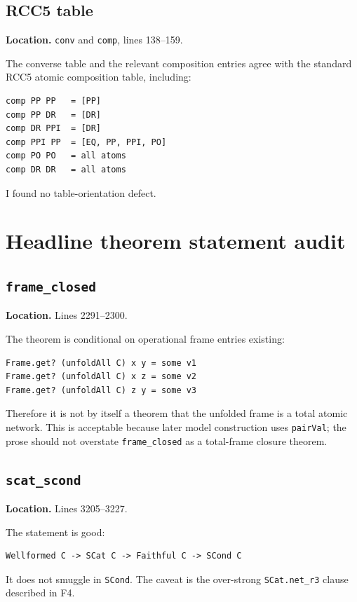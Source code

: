 \documentclass[11pt]{article}
\begin{document}
\subsection{RCC5 table}

\textbf{Location.} \texttt{conv} and \texttt{comp}, lines 138--159.

The converse table and the relevant composition entries agree with the standard
RCC5 atomic composition table, including:
\begin{lstlisting}
comp PP PP   = [PP]
comp PP DR   = [DR]
comp DR PPI  = [DR]
comp PPI PP  = [EQ, PP, PPI, PO]
comp PO PO   = all atoms
comp DR DR   = all atoms
\end{lstlisting}
I found no table-orientation defect.

\section{Headline theorem statement audit}

\subsection{\texttt{frame\_closed}}

\textbf{Location.} Lines 2291--2300.

The theorem is conditional on operational frame entries existing:
\begin{lstlisting}
Frame.get? (unfoldAll C) x y = some v1
Frame.get? (unfoldAll C) x z = some v2
Frame.get? (unfoldAll C) z y = some v3
\end{lstlisting}
Therefore it is not by itself a theorem that the unfolded frame is a total
atomic network.  This is acceptable because later model construction uses
\texttt{pairVal}; the prose should not overstate \texttt{frame\_closed} as a
total-frame closure theorem.

\subsection{\texttt{scat\_scond}}

\textbf{Location.} Lines 3205--3227.

The statement is good:
\begin{lstlisting}
Wellformed C -> SCat C -> Faithful C -> SCond C
\end{lstlisting}
It does not smuggle in \texttt{SCond}.  The caveat is the over-strong
\texttt{SCat.net\_r3} clause described in F4.
\end{document}
